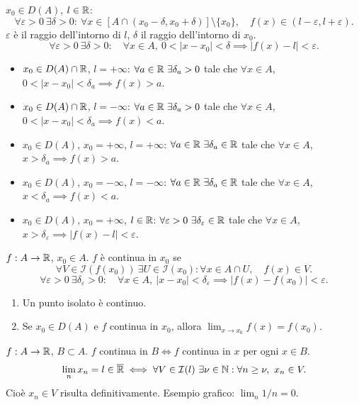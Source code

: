 $x_0\in D(A)$, $l\in\mathbb R$:
\[\forall\varepsilon>0\ \exists\delta>0:\ \forall x\in[A\cap(x_0-\delta,x_0+\delta)]\setminus\{x_0\},\quad f(x)\in(l-\varepsilon,l+\varepsilon).\]
$\varepsilon$ è il raggio dell'intorno di $l$, $\delta$ il raggio dell'intorno di $x_0$.
\[\forall\varepsilon>0\ \exists\delta>0:\quad\forall x\in A,\ 0<|x-x_0|<\delta\implies|f(x)-l|<\varepsilon.\]
\begin{itemize}
\item $x_0\in D(A)\cap\mathbb R$, $l=+\infty$:
$\forall a\in\mathbb R\ \exists\delta_a>0$ tale che $\forall x\in A$, $0<|x-x_0|<\delta_a\implies f(x)>a$.
\item $x_0\in D(A)\cap\mathbb R$, $l=-\infty$:
$\forall a\in\mathbb R\ \exists\delta_a>0$ tale che $\forall x\in A$, $0<|x-x_0|<\delta_a\implies f(x)<a$.
\item $x_0\in D(A)$, $x_0=+\infty$, $l=+\infty$:
$\forall a\in\mathbb R\ \exists\delta_a\in\mathbb R$ tale che $\forall x\in A$, $x>\delta_a\implies f(x)>a$.
\item $x_0\in D(A)$, $x_0=-\infty$, $l=-\infty$:
$\forall a\in\mathbb R\ \exists\delta_a\in\mathbb R$ tale che $\forall x\in A$, $x<\delta_a\implies f(x)<a$.
\item $x_0\in D(A)$, $x_0=+\infty$, $l\in\mathbb R$:
$\forall\varepsilon>0\ \exists\delta_\varepsilon\in\R$ tale che $\forall x\in A$, $x>\delta_\varepsilon\implies|f(x)-l|<\varepsilon$.
\end{itemize}
$f:A\to\mathbb R$, $x_0\in A$. $f$ è continua in $x_0$ se
\[\forall V\in\mathcal I(f(x_0))\ \exists U\in\mathcal I(x_0):\forall x\in A\cap U,\quad f(x)\in V.\]
\[\forall\varepsilon>0\ \exists\delta_\varepsilon>0:\quad\forall x\in A,\ |x-x_0|<\delta_\varepsilon\implies|f(x)-f(x_0)|<\varepsilon.\]
\begin{enumerate}\item Un punto isolato è continuo.
\item Se $x_0\in D(A)$ e $f$ continua in $x_0$, allora $\lim_{x\to x_0}f(x)=f(x_0)$.
\end{enumerate}
$f:A\to\mathbb R$, $B\subset A$. $f$ continua in $B\iff f$ continua in $x$ per ogni $x\in B$.
\[\lim_nx_n=l\in\overline{\mathbb R}\iff\forall V\in\mathcal I(l)\ \exists\nu\in\mathbb N:\forall n\ge\nu,\ x_n\in V.\]
Cioè $x_n\in V$ risulta definitivamente. Esempio grafico: $\lim_n1/n=0$.
